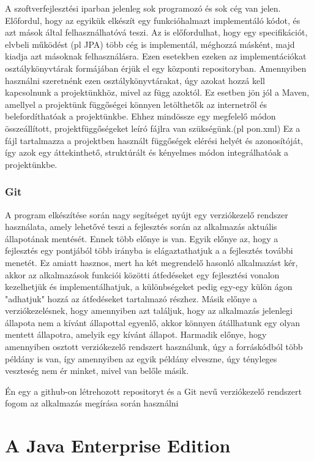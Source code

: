\documentclass[centeredchapter]{thesis-ekf}
\theoremstyle{definition}
\theoremstyle{remark}
\begin{document}
A szoftverfejlesztési iparban jelenleg sok programozó és sok cég van jelen. Előfordul, hogy az egyikük elkészít egy funkcióhalmazt implementáló kódot, és azt mások által felhasználhatóvá teszi.
Az is előfordulhat, hogy egy specifikációt, elvbeli működést (pl JPA) több cég is implementál, méghozzá másként, majd kiadja azt másoknak felhasználásra. Ezen esetekben ezeken az implementációkat osztálykönyvtárak formájában érjük el egy központi repositoryban. Amennyiben használni szeretnénk ezen osztálykönyvtárakat, úgy azokat hozzá kell kapcsolnunk a projektünkhöz, mivel az függ azoktól. Ez esetben jön jól a Maven, amellyel a projektünk függőségei könnyen letölthetők az internetről és belefordíthatóak a projektünkbe. Ehhez mindössze egy megfelelő módon összeállított, projektfüggőségeket leíró fájlra van szükségünk.(pl pon.xml) Ez a fájl tartalmazza a projektben használt függőségek elérési helyét és azonosítóját, így azok egy áttekinthető, struktúrált és kényelmes módon integrálhatóak a projektünkbe.

\subsection{Git}

A program elkészítése során nagy segítséget nyújt egy verziókezelő rendszer használata, amely lehetővé teszi a fejlesztés során az alkalmazás aktuális állapotának mentését. Ennek több előnye is van. Egyik előnye az, hogy a fejlesztés egy pontjából több irányba is elágaztathatjuk a a fejlesztés további menetét. Ez amiatt hasznos, mert ha két megrendelő hasonló alkalmazást kér, akkor az alkalmazások funkciói közötti átfedéseket egy fejlesztési vonalon kezelhetjük és implementálhatjuk, a különbségeket pedig egy-egy külön ágon "adhatjuk" hozzá az átfedéseket tartalmazó részhez. Másik előnye a verziókezelésnek, hogy amennyiben azt találjuk, hogy az alkalmazás jelenlegi állapota nem a kívánt állapottal egyenlő, akkor könnyen átállhatunk egy olyan mentett állapotra, amelyik egy kívánt állapot. Harmadik előnye, hogy amennyiben osztott verziókezelő rendszert használunk, úgy a forráskódból több példány is van, így amennyiben az egyik példány elveszne, úgy tényleges veszteség nem ér minket, mivel van belőle másik.

Én egy a github-on létrehozott repositoryt és a Git nevű verziókezelő rendszert fogom az alkalmazás megírása során használni


\chapter{A Java Enterprise Edition}
\end{document}
